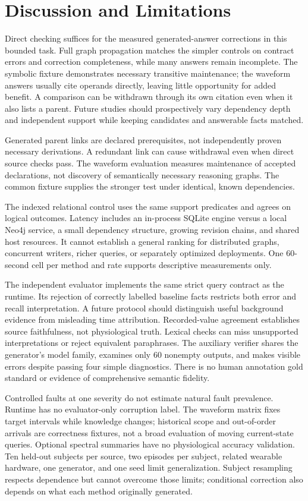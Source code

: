 \section{Discussion and Limitations}

Direct checking suffices for the measured generated-answer corrections in this
bounded task. Full graph propagation matches the simpler controls on contract
errors and correction completeness, while many answers remain incomplete. The
symbolic fixture demonstrates necessary transitive maintenance; the waveform
answers usually cite operands directly, leaving little opportunity for added
benefit. A comparison can be withdrawn through its own citation even when it
also lists a parent. Future studies should prospectively vary dependency depth
and independent support while keeping candidates and answerable facts matched.

Generated parent links are declared prerequisites, not independently proven
necessary derivations. A redundant link can cause withdrawal even when direct
source checks pass. The waveform evaluation measures maintenance of accepted
declarations, not discovery of semantically necessary reasoning graphs. The
common fixture supplies the stronger test under identical, known dependencies.

The indexed relational control uses the same support predicates and agrees on
logical outcomes. Latency includes an in-process SQLite engine versus a local
Neo4j service, a small dependency structure, growing revision chains, and shared
host resources. It cannot establish a general ranking for distributed graphs,
concurrent writers, richer queries, or separately optimized deployments. One
60-second cell per method and rate supports descriptive measurements only.

The independent evaluator implements the same strict query contract as the
runtime. Its rejection of correctly labelled baseline facts restricts both
error and recall interpretation. A future protocol should distinguish useful
background evidence from misleading time attribution. Recorded-value agreement
establishes source faithfulness, not physiological truth. Lexical checks can
miss unsupported interpretations or reject equivalent paraphrases. The auxiliary
verifier shares the generator's model family, examines only 60 nonempty outputs,
and makes visible errors despite passing four simple diagnostics. There is no
human annotation gold standard or evidence of comprehensive semantic fidelity.

Controlled faults at one severity do not estimate natural fault prevalence.
Runtime has no evaluator-only corruption label. The waveform matrix fixes target
intervals while knowledge changes; historical scope and out-of-order arrivals
are correctness fixtures, not a broad evaluation of moving current-state queries.
Optional spectral summaries have no physiological accuracy validation. Ten
held-out subjects per source, two episodes per subject, related wearable hardware,
one generator, and one seed limit generalization. Subject resampling respects
dependence but cannot overcome those limits; conditional correction also depends
on what each method originally generated.

